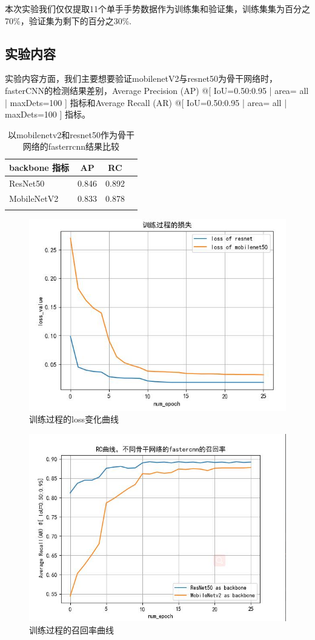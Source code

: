 \documentclass[UTF8,a4paper,12pt]{ctexart}
\begin{document}
本次实验我们仅仅提取11个单手手势数据作为训练集和验证集，训练集集为百分之70\%，验证集为剩下的百分之30\%.


\subsection{实验内容}
实验内容方面，我们主要想要验证mobilenetV2与resnet50为骨干网络时，fasterCNN的检测结果差别，Average Precision  (AP) @[ IoU=0.50:0.95 | area=   all | maxDets=100 ] 指标和Average Recall     (AR) @[ IoU=0.50:0.95 | area=   all | maxDets=100 ] 指标。


\begin{table}[htbp]
	\centering
	\caption{以mobilenetv2和resnet50作为骨干网络的fasterrcnn结果比较}
	\begin{tabular}{l c c r}
		\hline\hline
	backbone 指标 & AP & RC \\
	\hline
	ResNet50 & 0.846 & 0.892 \\
	MobileNetV2& 0.833 & 0.878 \\	
	\hline
	\label{table-在手势数据集上最终得到的结果比较}
	\end{tabular}	
\end{table}

\begin{figure}[htbp]
	\centering
	\includegraphics[width=0.5\linewidth]{webmin/训练过程的损失曲线.jpg}
	
	\caption{训练过程的loss变化曲线}
	\label{fig-loss曲线}
\end{figure}
\begin{figure}[htbp]
	\centering
	\includegraphics[width=0.5\linewidth]{webmin/召回率不同曲线的召回率.jpg}
	
	\caption{训练过程的召回率曲线}
	\label{fig-rc曲线}
\end{figure}
\end{document}
